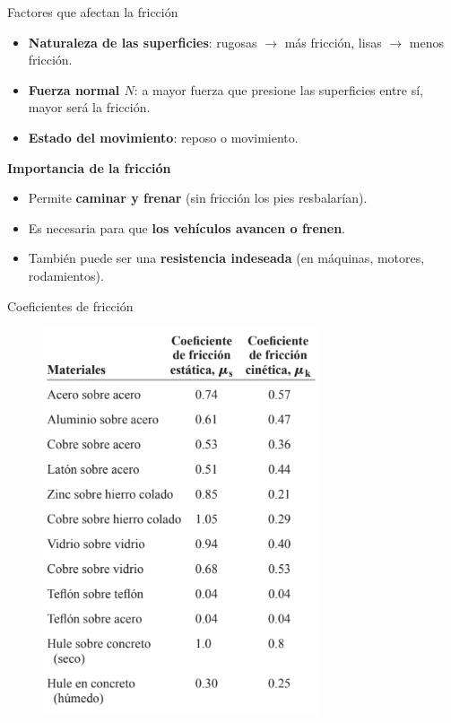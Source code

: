 \begin{frame}{Factores que afectan la fricción}

\begin{itemize}
    \item \textbf{Naturaleza de las superficies}: rugosas $\rightarrow$ más fricción, lisas $\rightarrow$ menos fricción.
    \item \textbf{Fuerza normal \(N\)}: a mayor fuerza que presione las superficies entre sí, mayor será la fricción.
    \item \textbf{Estado del movimiento}: reposo o movimiento.
\end{itemize}

\vspace{1em}

\textbf{Importancia de la fricción}

\begin{itemize}
    \item Permite \textbf{caminar y frenar} (sin fricción los pies resbalarían).
    \item Es necesaria para que \textbf{los vehículos avancen o frenen}.
    \item También puede ser una \textbf{resistencia indeseada} (en máquinas, motores, rodamientos).
\end{itemize}

\end{frame}

\begin{frame}{Coeficientes de fricción}
    \begin{figure}
        \centering
        \includegraphics[width=0.4\linewidth]{figures/coef-fric.png}
    \end{figure}
\end{frame}

